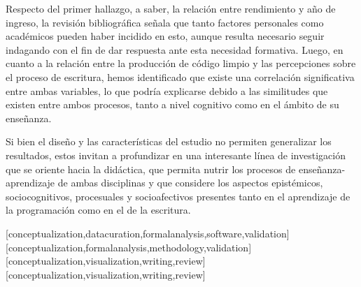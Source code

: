 \documentclass[spanish]{textolivre}
\begin{document}
Respecto del primer hallazgo, a saber, la relación entre rendimiento y año de ingreso, la revisión bibliográfica señala que tanto factores personales como académicos pueden haber incidido en esto, aunque resulta necesario seguir indagando con el fin de dar respuesta ante esta necesidad formativa. Luego, en cuanto a la relación entre la producción de código limpio y las percepciones sobre el proceso de escritura, hemos identificado que existe una correlación significativa entre ambas variables, lo que podría explicarse debido a las similitudes que existen entre ambos procesos, tanto a nivel cognitivo como en el ámbito de su enseñanza. 

Si bien el diseño y las características del estudio no permiten generalizar los resultados, estos invitan a profundizar en una interesante línea de investigación que se oriente hacia la didáctica, que permita nutrir los procesos de enseñanza-aprendizaje de ambas disciplinas y que considere los aspectos epistémicos, sociocognitivos, procesuales y socioafectivos presentes tanto en el aprendizaje de la programación como en el de la escritura.


\printbibliography\label{sec-bib}


\begin{contributors}
[conceptualization,datacuration,formalanalysis,software,validation]
[conceptualization,formalanalysis,methodology,validation]
[conceptualization,visualization,writing,review]
[conceptualization,visualization,writing,review]

\end{contributors}
\end{document}
